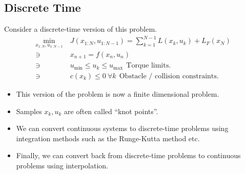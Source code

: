 \subsection{Discrete Time}
Consider a discrete-time version of this problem. 
\begin{align}
    \min_{x_{1:N}, u_{1:N-1}} \ & J(x_{1:N}, u_{1:N-1}) = \sum_{k=1}^{N-1} L(x_k, u_k) + L_F(x_N) \\
    \ni \ & x_{n+1} = f(x_n,u_n) \\
    \ni \ & u_{\min} \leq u_k \leq u_{\max} \ \ \textrm{Torque limits.} \\
    \ni \ & c(x_k) \leq 0 \ \forall k \ \ \textrm{Obstacle / collision constraints.}
\end{align}
\begin{itemize}
    \item This version of the problem is now a finite dimensional problem.
    \item Samples $x_k,u_k$ are often called ``knot points''. 
    \item We can convert continuous systems to discrete-time problems using integration methods such as the Runge-Kutta method etc.
    \item Finally, we can convert back from discrete-time problems to continuous problems using interpolation. 
\end{itemize}
  



